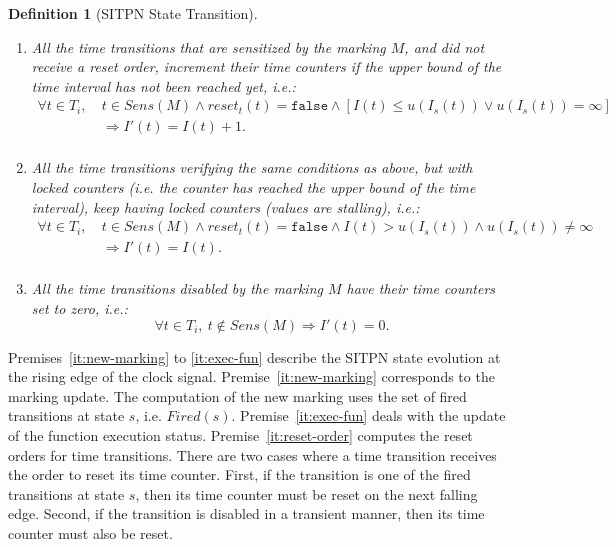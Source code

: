 \documentclass[pdflatex,sn-mathphys]{sn-jnl}%
\theoremstyle{thmstyleone}%
\theoremstyle{thmstyletwo}%
\theoremstyle{thmstylethree}%
\newtheorem{definition}{Definition}%
\begin{document}
\begin{definition}[SITPN State Transition]
\begin{itemize}
\begin{enumerate}[resume]
    \item\label{it:inc-counters} All the time transitions that are
      sensitized by the marking $M$, and did not receive a reset
      order, increment their time counters if the upper bound of the
      time interval has not been reached yet, i.e.:
      \begin{equation*}
        \begin{split}
          \forall{}t\in{}T_i,~&t\in{}Sens(M)\land{}reset_t(t)=\mathtt{false}\land{}[I(t)\le{}u(I_s(t))\lor{}u(I_s(t))=\infty]\\
                              & \Rightarrow{}I'(t)=I(t)+1. \\
        \end{split}
      \end{equation*}
    \item\label{it:locked-counters} All the time transitions verifying
      the same conditions as above, but with locked counters (i.e. the
      counter has reached the upper bound of the time interval), keep
      having locked counters (values are stalling), i.e.:
      \begin{equation*}
        \begin{split}
          \forall{}t\in{}T_i,~&t\in{}Sens(M)\land{}reset_t(t)=\mathtt{false}\land{}I(t)>{}u(I_s(t))\land{}u(I_s(t))\neq\infty\\
                              & \Rightarrow{}I'(t)=I(t).\\
        \end{split}
      \end{equation*}
      
    \item\label{it:reset-not-sens} All the time transitions disabled
      by the marking $M$ have their time counters set to zero, i.e.:
      \begin{equation*}
        \forall{}t\in{}T_i,~t\notin{}Sens(M)\Rightarrow{}I'(t)=0.
      \end{equation*}
    \end{enumerate}
    
  \end{itemize}
\end{definition}

Premises~\ref{it:new-marking} to \ref{it:exec-fun} describe the SITPN
state evolution at the rising edge of the clock signal.
Premise~\ref{it:new-marking} corresponds to the marking update. The
computation of the new marking uses the set of fired transitions at
state $s$, i.e. $Fired(s)$. Premise~\ref{it:exec-fun} deals with the
update of the function execution status. Premise~\ref{it:reset-order}
computes the reset orders for time transitions. There are two cases
where a time transition receives the order to reset its time
counter. First, if the transition is one of the fired transitions at
state $s$, then its time counter must be reset on the next falling
edge. Second, if the transition is disabled in a transient manner,
then its time counter must also be reset.
\end{document}
